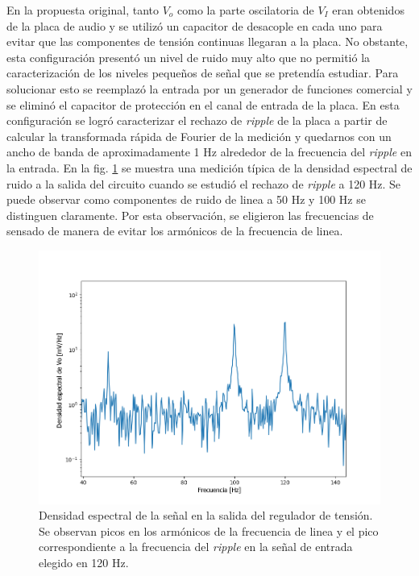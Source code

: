 \documentclass[a4paper,11pt]{article}
\begin{document}
En la propuesta original, tanto $V_o$ como la parte oscilatoria de $V_I$ eran obtenidos de la placa de audio y se utilizó un capacitor de desacople en cada uno para evitar que las componentes de tensión continuas llegaran a la placa. No obstante, esta configuración presentó un nivel de ruido muy alto que no permitió la caracterización de los niveles pequeños de señal que se pretendía estudiar. Para solucionar esto se reemplazó la entrada por un generador de funciones comercial y se eliminó el capacitor de protección en el canal de entrada de la placa. En esta configuración se logró caracterizar el rechazo de \textit{ripple} de la placa a partir de calcular la transformada rápida de Fourier de la medición y quedarnos con un ancho de banda de aproximadamente 1 Hz alrededor de la frecuencia del \textit{ripple} en la entrada. En la fig. \ref{fig:fft} se muestra una medición típica de la densidad espectral de ruido a la salida del circuito cuando se estudió el rechazo de \textit{ripple} a 120 Hz. Se puede observar como componentes de ruido de linea a 50 Hz y 100 Hz se distinguen claramente. Por esta observación, se eligieron las frecuencias de sensado de manera de evitar los armónicos de la frecuencia de linea.  
		
	\begin{figure}[h]
		\centering
		\includegraphics[width=\textwidth]{imagenes/riple120.png}
		\caption{Densidad espectral de la señal en la salida del regulador de tensión. Se observan picos en los armónicos de la frecuencia de linea y el pico correspondiente a la frecuencia del \textit{ripple} en la señal de entrada elegido en 120 Hz.}
		\label{fig:fft}
	\end{figure}
		
\end{document}

